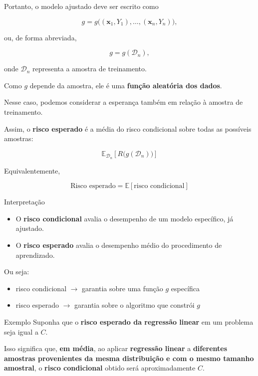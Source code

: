 \documentclass[
  ignorenonframetext,
  aspectratio=169,
]{beamer}
\providecommand{\tightlist}{%
  \setlength{\itemsep}{0pt}\setlength{\parskip}{0pt}}
\begin{document}
\begin{frame}
Portanto, o modelo ajustado deve ser escrito como

\[
g = g\big((\mathbf{x}_1,Y_1),\ldots,(\mathbf{x}_n,Y_n)\big),
\]

ou, de forma abreviada,

\[
g = g(\mathcal{D}_n),
\]

onde \(\mathcal{D}_n\) representa a amostra de treinamento.

Como \(g\) depende da amostra, ele é uma \textbf{função aleatória dos
dados}.

Nesse caso, podemos considerar a esperança também em relação à amostra
de treinamento.
\end{frame}

\begin{frame}
Assim, o \textbf{risco esperado} é a média do risco condicional sobre
todas as possíveis amostras:

\[
\mathbb{E}_{\mathcal{D}_n}\left[R\big(g(\mathcal{D}_n)\big)\right]
\]

Equivalentemente,

\[
\text{Risco esperado} = \mathbb{E}[\text{risco condicional}]
\]
\end{frame}

\begin{frame}
\begin{block}{Interpretação}
\label{interpretauxe7uxe3o}
\begin{itemize}
\tightlist
\item
  O \textbf{risco condicional} avalia o desempenho de um modelo
  específico, já ajustado.
\item
  O \textbf{risco esperado} avalia o desempenho médio do procedimento de
  aprendizado.
\end{itemize}

Ou seja:

\begin{itemize}
\tightlist
\item
  risco condicional \(\rightarrow\) garantia sobre uma função \(g\)
  específica
\item
  risco esperado \(\rightarrow\) garantia sobre o algoritmo que constrói
  \(g\)
\end{itemize}
\end{block}
\end{frame}

\begin{frame}
\begin{block}{Exemplo}
\label{exemplo}
Suponha que o \textbf{risco esperado da regressão linear} em um problema
seja igual a \(C\).

Isso significa que, \textbf{em média}, ao aplicar \textbf{regressão
linear} a \textbf{diferentes amostras provenientes da mesma distribuição
e com o mesmo tamanho amostral}, o \textbf{risco condicional} obtido
será aproximadamente \(C\).
\end{block}
\end{frame}
\end{document}

